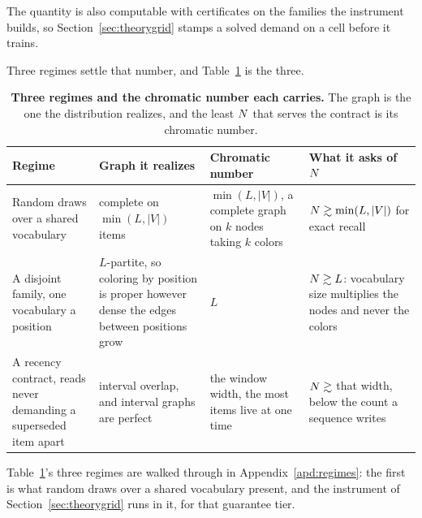 The quantity is also computable with certificates on the families the instrument builds, so Section~\ref{sec:theorygrid} stamps a solved demand on a cell before it trains.

Three regimes settle that number, and Table~\ref{tab:regimes} is the three.

\begin{table}[H]
\centering
\scriptsize
\setlength{\tabcolsep}{3pt}
\caption{\textbf{Three regimes and the chromatic number each carries.} The graph is the one the distribution realizes, and the least $N$ that serves the contract is its chromatic number.}
\label{tab:regimes}
\begin{tabular}{@{}>{\raggedright\arraybackslash}p{3.3cm}>{\raggedright\arraybackslash}p{4.6cm}>{\raggedright\arraybackslash}p{2.9cm}>{\raggedright\arraybackslash}p{3.9cm}@{}}
\toprule
Regime & Graph it realizes & Chromatic number & What it asks of $N$ \\
\midrule
Random draws over a shared vocabulary & complete on $\min(L, |V|)$ items & $\min(L, |V|)$, a complete graph on $k$ nodes taking $k$ colors & $N \gtrsim \min(L, |V|)$ for exact recall \\
A disjoint family, one vocabulary a position & $L$-partite, so coloring by position is proper however dense the edges between positions grow & $L$ & $N \gtrsim L$: vocabulary size multiplies the nodes and never the colors \\
A recency contract, reads never demanding a superseded item apart & interval overlap, and interval graphs are perfect & the window width, the most items live at one time & $N \gtrsim$ that width, below the count a sequence writes \\
\bottomrule
\end{tabular}
\end{table}

Table~\ref{tab:regimes}'s three regimes are walked through in Appendix~\ref{apd:regimes}: the first is what random draws over a shared vocabulary present, and the instrument of Section~\ref{sec:theorygrid} runs in it, for that guarantee tier.

